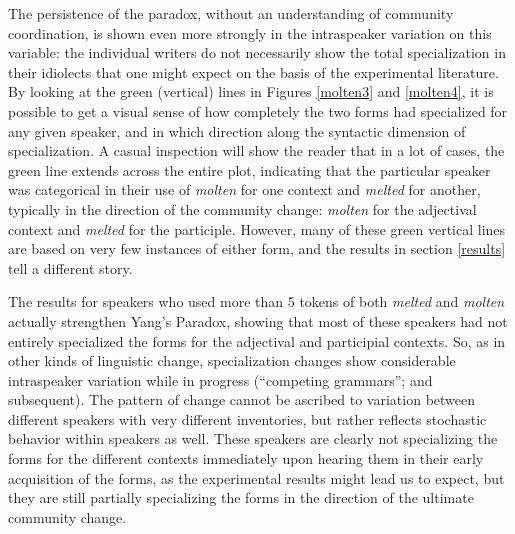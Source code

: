 \documentclass{artikel3}
\begin{document}
The persistence of the paradox, without an understanding of community coordination, is shown even more strongly in the intraspeaker variation on this variable: the individual writers do not necessarily show the total specialization in their idiolects that one might expect on the basis of the experimental literature. By looking at the green (vertical) lines in Figures \ref{molten3} and \ref{molten4}, it is possible to get a visual sense of how completely the two forms had specialized for any given speaker, and in which direction along the syntactic dimension of specialization. A casual inspection will show the reader that in a lot of cases, the green line extends across the entire plot, indicating that the particular speaker was categorical in their use of \textsl{molten} for one context and \textsl{melted} for another, typically in the direction of the community change: \textsl{molten} for the  adjectival context and \textsl{melted} for the participle. However, many of these green vertical lines are based on very few instances of either form, and the results in section \ref{results} tell a different story. 

The results for speakers who used more than 5 tokens of both \textsl{melted} and \textsl{molten} actually strengthen Yang's Paradox, showing that most of these speakers had not entirely specialized the forms for the adjectival and participial contexts. So, as in other kinds of linguistic change, specialization changes show considerable intraspeaker variation while in progress (``competing grammars''; \citealt{kroch1989} and subsequent). The pattern of change cannot be ascribed to variation between different speakers with very different inventories, but rather reflects stochastic behavior within speakers as well. These speakers are clearly not specializing the forms for the different contexts immediately upon hearing them in their early acquisition of the forms, as the experimental results might lead us to expect, but they are still partially specializing the forms in the direction of the ultimate community change.
\end{document}
